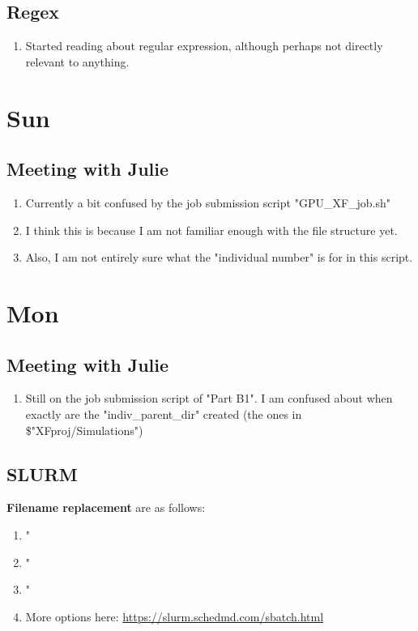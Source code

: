 \documentclass[12pt,letterpaper]{article}
\begin{document}
\subsection{Regex}
\begin{enumerate}
  \item Started reading about regular expression, although perhaps not directly relevant
    to anything.
\end{enumerate}

\section{Sun}
\subsection{Meeting with Julie}
\begin{enumerate}
  \item Currently a bit confused by the job submission script "GPU_XF_job.sh"
  \item I think this is because I am not familiar enough with the file structure yet.
  \item Also, I am not entirely sure what the "individual number" is for in this script.
\end{enumerate}

\section{Mon}
\subsection{Meeting with Julie}
\begin{enumerate}
  \item Still on the job submission script of "Part B1". I am confused about when
    exactly are the "indiv_parent_dir" created 
    (the ones in \$"XFproj/Simulations")
\end{enumerate}
\subsection{SLURM}
  \textbf{Filename replacement} are as follows:
\begin{enumerate}
  \item "%
  \item "%
  \item "%
  \item More options here: \url{https://slurm.schedmd.com/sbatch.html}
\end{enumerate}
\end{document}
